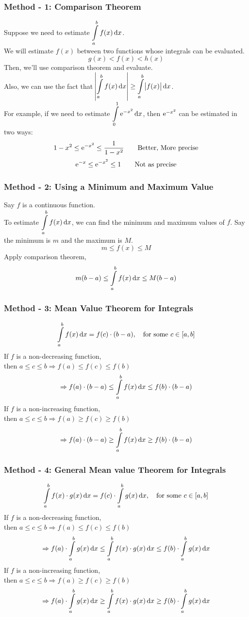 \documentclass[14]{article}
\theoremstyle{definition}
\theoremstyle{case}
\begin{document}
\subsubsection{Method - 1: Comparison Theorem}
Suppose we need to estimate $\displaystyle\int\limits_a^b f(x) \dif x$.\\
We will estimate $f(x)$ between two functions whose integrals can be evaluated.
\[g(x) < f(x) < h(x)\]
Then, we'll use comparison theorem and evaluate.\\
Also, we can use the fact that $\abs{\displaystyle\int\limits_a^b f(x) \dif x} \geq \displaystyle\int\limits_a^b \abs{f(x)} \dif x$.\\
For example, if we need to estimate $\displaystyle\int\limits_0^1 {\rm e}^{-x^2} \dif x$, then ${\rm e}^{-x^2}$ can be estimated in two ways:
\[1-x^2 \leq {\rm e}^{-x^2} \leq \dfrac1{1 - x^2} \text{\quad\quad Better, More precise}\]
\[{\rm e}^{-x} \leq {\rm e}^{-x^2} \leq 1 \text{\quad\quad Not as precise}\]
\subsubsection{Method - 2: Using a Minimum and Maximum Value}
Say $f$ is a continuous function.\\
To estimate $\displaystyle\int\limits_a^b f(x) \dif x$, we can find the minimum and maximum values of $f$. Say the minimum is $m$ and the maximum is $M$.
\[m \leq f(x) \leq M\]
Apply comparison theorem,
\[m(b-a) \leq \int\limits_a^b f(x) \dif x \leq M(b-a)\]
\subsubsection{Method - 3: Mean Value Theorem for Integrals}
\[\int\limits_a^b f(x) \dif x = f(c) \cdot (b-a), \quad \text{for some }c \in [a, b]\]
If $f$ is a non-decreasing function,\\
then $a \leq c \leq b \Rightarrow f(a) \leq f(c) \leq f(b)$
\[\Rightarrow f(a) \cdot (b-a) \leq \int\limits_a^b f(x) \dif x \leq f(b) \cdot (b-a)\]
If $f$ is a non-increasing function,\\
then $a \leq c \leq b \Rightarrow f(a) \geq f(c) \geq f(b)$
\[\Rightarrow f(a) \cdot (b-a) \geq \int\limits_a^b f(x) \dif x \geq f(b) \cdot (b-a)\]
\pagebreak
\subsubsection{Method - 4: General Mean value Theorem for Integrals}
\[\int\limits_a^b f(x) \cdot g(x) \dif x  = f(c) \cdot \int\limits_a^b g(x) \dif x, \quad \text{for some }c \in [a, b]\]
If $f$ is a non-decreasing function,\\
then $a \leq c \leq b \Rightarrow f(a) \leq f(c) \leq f(b)$
\[\Rightarrow f(a) \cdot \int\limits_a^b g(x) \dif x \leq \int\limits_a^b f(x) \cdot g(x) \dif x \leq f(b) \cdot \int\limits_a^b g(x) \dif x\]
If $f$ is a non-increasing function,\\
then $a \leq c \leq b \Rightarrow f(a) \geq f(c) \geq f(b)$
\[\Rightarrow f(a) \cdot \int\limits_a^b g(x) \dif x \geq \int\limits_a^b f(x) \cdot g(x) \dif x \geq f(b) \cdot \int\limits_a^b g(x) \dif x\]
\end{document}

